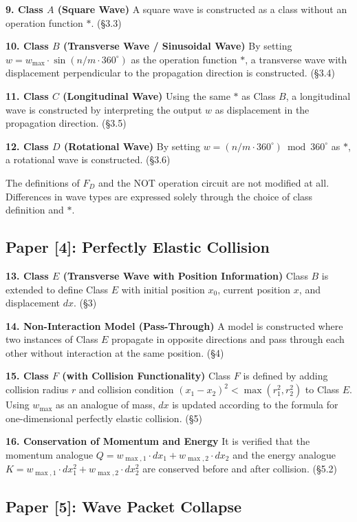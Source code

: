 \documentclass[12pt,a4paper]{article}
\begin{document}
\textbf{9. Class $A$ (Square Wave)}\quad
A square wave is constructed as a class without an operation function $*$. (\S 3.3)

\textbf{10. Class $B$ (Transverse Wave / Sinusoidal Wave)}\quad
By setting $w = w_{\max} \cdot \sin(n/m \cdot 360^\circ)$ as the operation function $*$, a transverse wave with displacement perpendicular to the propagation direction is constructed. (\S 3.4)

\textbf{11. Class $C$ (Longitudinal Wave)}\quad
Using the same $*$ as Class $B$, a longitudinal wave is constructed by interpreting the output $w$ as displacement in the propagation direction. (\S 3.5)

\textbf{12. Class $D$ (Rotational Wave)}\quad
By setting $w = (n/m \cdot 360^\circ) \bmod 360^\circ$ as $*$, a rotational wave is constructed. (\S 3.6)

The definitions of $F_D$ and the NOT operation circuit are not modified at all. Differences in wave types are expressed solely through the choice of class definition and $*$.

\subsection*{Paper [4]: Perfectly Elastic Collision}

\textbf{13. Class $E$ (Transverse Wave with Position Information)}\quad
Class $B$ is extended to define Class $E$ with initial position $x_0$, current position $x$, and displacement $dx$. (\S 3)

\textbf{14. Non-Interaction Model (Pass-Through)}\quad
A model is constructed where two instances of Class $E$ propagate in opposite directions and pass through each other without interaction at the same position. (\S 4)

\textbf{15. Class $F$ (with Collision Functionality)}\quad
Class $F$ is defined by adding collision radius $r$ and collision condition $(x_1 - x_2)^2 < \max(r_1^2, r_2^2)$ to Class $E$. Using $w_{\max}$ as an analogue of mass, $dx$ is updated according to the formula for one-dimensional perfectly elastic collision. (\S 5)

\textbf{16. Conservation of Momentum and Energy}\quad
It is verified that the momentum analogue $Q = w_{\max,1} \cdot dx_1 + w_{\max,2} \cdot dx_2$ and the energy analogue $K = w_{\max,1} \cdot dx_1^2 + w_{\max,2} \cdot dx_2^2$ are conserved before and after collision. (\S 5.2)

\subsection*{Paper [5]: Wave Packet Collapse}
\end{document}
